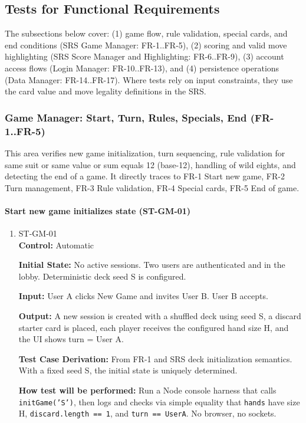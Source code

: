 \documentclass[12pt, titlepage]{article}
\begin{document}
\subsection{Tests for Functional Requirements}

The subsections below cover: (1) game flow, rule validation, special cards, and end conditions (SRS Game Manager: FR-1..FR-5), (2) scoring and valid move highlighting (SRS Score Manager and Highlighting: FR-6..FR-9), (3) account access flows (Login Manager: FR-10..FR-13), and (4) persistence operations (Data Manager: FR-14..FR-17). Where tests rely on input constraints, they use the card value and move legality definitions in the SRS.

\subsubsection{Game Manager: Start, Turn, Rules, Specials, End (FR-1..FR-5)}

This area verifies new game initialization, turn sequencing, rule validation for same suit or same value or sum equals 12 (base-12), handling of wild eights, and detecting the end of a game. It directly traces to FR-1 Start new game, FR-2 Turn management, FR-3 Rule validation, FR-4 Special cards, FR-5 End of game.

\paragraph{Start new game initializes state (ST-GM-01)}
\begin{enumerate}
\item{ST-GM-01\\}
\textbf{Control:} Automatic

\textbf{Initial State:} No active sessions. Two users are authenticated and in the lobby. Deterministic deck seed S is configured.

\textbf{Input:} User A clicks New Game and invites User B. User B accepts.

\textbf{Output:} A new session is created with a shuffled deck using seed S, a discard starter card is placed, each player receives the configured hand size H, and the UI shows turn = User A.

\textbf{Test Case Derivation:} From FR-1 and SRS deck initialization semantics. With a fixed seed S, the initial state is uniquely determined.

\textbf{How test will be performed:} Run a Node console harness that calls \texttt{initGame('S')}, then logs and checks via simple equality that \texttt{hands} have size H, \texttt{discard.length == 1}, and \texttt{turn == UserA}. No browser, no sockets.
\end{enumerate}
\end{document}
